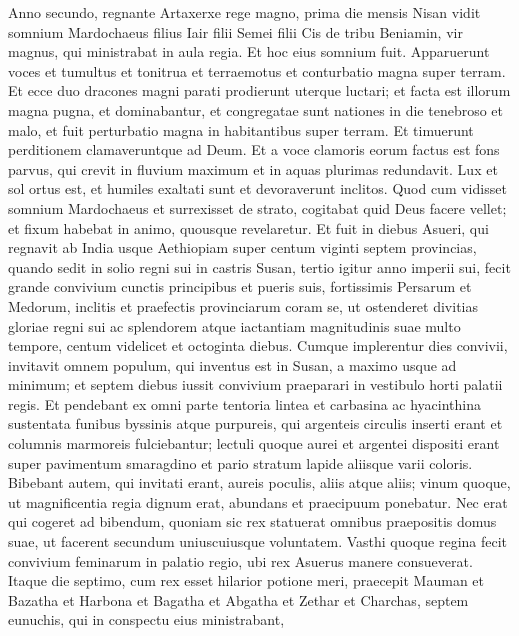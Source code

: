 \begin{biblechapter}
 \versea Anno secundo, regnante Artaxerxe rege magno, prima die mensis Nisan vidit somnium Mardochaeus filius Iair filii Semei filii Cis de tribu Beniamin, 
\verseb vir magnus, qui ministrabat in aula regia.
 \versec Et hoc eius somnium fuit. Apparuerunt voces et tumultus et tonitrua et terraemotus et conturbatio magna super terram. 
\versed Et ecce duo dracones magni parati prodierunt uterque luctari; 
\versee et facta est illorum magna pugna, et dominabantur, et congregatae sunt nationes 
\versef in die tenebroso et malo, et fuit perturbatio magna in habitantibus super terram. 
\verseg Et timuerunt perditionem 
\verseh clamaveruntque ad Deum. Et a voce clamoris eorum factus est fons parvus, qui crevit in fluvium maximum et in aquas plurimas redundavit. 
 \versei Lux et sol ortus est, et humiles exaltati sunt et devoraverunt inclitos. 
 \versek Quod cum vidisset somnium Mardochaeus et surrexisset de strato, cogitabat quid Deus facere vellet; et fixum habebat in animo, quousque revelaretur.
 \verse Et fuit in diebus Asueri, qui regnavit ab India usque Aethiopiam super centum viginti septem provincias, 
\verse quando sedit in solio regni sui in castris Susan, 
\verse tertio igitur anno imperii sui, fecit grande convivium cunctis principibus et pueris suis, fortissimis Persarum et Medorum, inclitis et praefectis provinciarum coram se, 
\verse ut ostenderet divitias gloriae regni sui ac splendorem atque iactantiam magnitudinis suae multo tempore, centum videlicet et octoginta diebus.
 \verse Cumque implerentur dies convivii, invitavit omnem populum, qui inventus est in Susan, a maximo usque ad minimum; et septem diebus iussit convivium praeparari in vestibulo horti palatii regis. 
\verse Et pendebant ex omni parte tentoria lintea et carbasina ac hyacinthina sustentata funibus byssinis atque purpureis, qui argenteis circulis inserti erant et columnis marmoreis fulciebantur; lectuli quoque aurei et argentei dispositi erant super pavimentum smaragdino et pario stratum lapide aliisque varii coloris. 
\verse Bibebant autem, qui invitati erant, aureis poculis, aliis atque aliis; vinum quoque, ut magnificentia regia dignum erat, abundans et praecipuum ponebatur. 
\verse Nec erat qui cogeret ad bibendum, quoniam sic rex statuerat omnibus praepositis domus suae, ut facerent secundum uniuscuiusque voluntatem.
 \verse Vasthi quoque regina fecit convivium feminarum in palatio regio, ubi rex Asuerus manere consueverat.
 \verse Itaque die septimo, cum rex esset hilarior potione meri, praecepit Mauman et Bazatha et Harbona et Bagatha et Abgatha et Zethar et Charchas, septem eunuchis, qui in conspectu eius ministrabant, 

\end{biblechapter}
